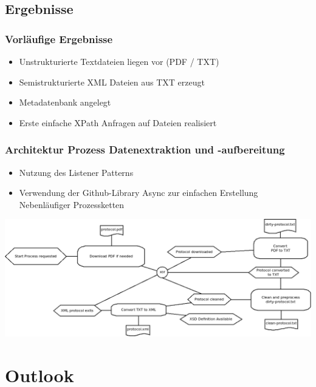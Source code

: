 \documentclass[11pt, a4paper]{beamer}
\begin{document}
\subsection{Ergebnisse}
\begin{frame}
\frametitle{Vorläufige Ergebnisse}
\begin{itemize}
\item Unstrukturierte Textdateien liegen vor (PDF / TXT)
\item Semistrukturierte XML Dateien aus TXT erzeugt
\item Metadatenbank angelegt
\item Erste einfache XPath Anfragen auf Dateien realisiert 
\end{itemize}
\end{frame}
\begin{frame}
  \frametitle{Architektur Prozess Datenextraktion und -aufbereitung }
  \begin{itemize}
  \item Nutzung des Listener Patterns \cite{javainsel9}
  \item Verwendung der Github-Library Async \cite{async} zur einfachen Erstellung Nebenläufiger Prozessketten
  \end{itemize}  
  \begin{center}
    \includegraphics[width=1\textwidth]{../../doc/process-overview.png}
  \end{center}
\end{frame}


\section{Outlook}
\end{document}
